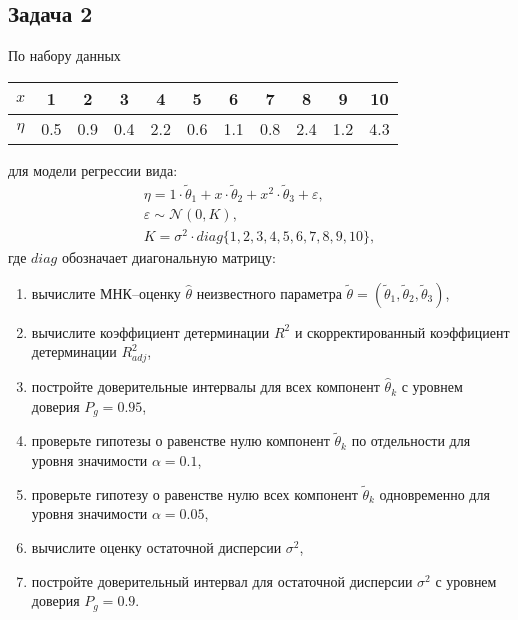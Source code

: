 \documentclass[a4paper,12pt]{article}
\begin{document}
\subsection*{Задача 2 \cite[391]{Efimov}}

По набору данных

\begin{center}
    \begin{tabular}{|c|c|c|c|c|c|c|c|c|c|c|}
        \hline
        $x$    & 1   & 2   & 3   & 4   & 5   & 6   & 7   & 8   & 9   & 10  \\
        \hline
        $\eta$ & 0.5 & 0.9 & 0.4 & 2.2 & 0.6 & 1.1 & 0.8 & 2.4 & 1.2 & 4.3 \\
        \hline
    \end{tabular}
\end{center}

\noindent для модели регрессии вида:
\begin{gather*}
    \eta = 1 \cdot \widetilde{\theta}_1 + x \cdot \widetilde{\theta}_2 + x^2 \cdot \widetilde{\theta}_3 + \varepsilon , \\
    \varepsilon \sim \mathcal{N} (0, K), \\
    K = \sigma^2 \cdot diag \{ 1, 2, 3, 4, 5, 6, 7, 8, 9, 10 \},
\end{gather*}
где $diag$ обозначает диагональную матрицу:
\begin{enumerate}
    \item вычислите МНК--оценку $\widehat{\theta}$ неизвестного параметра
          $\widetilde{\theta} = (\widetilde{\theta}_1, \widetilde{\theta}_2, \widetilde{\theta}_3)$,
    \item вычислите коэффициент детерминации $R^2$ и скорректированный коэффициент детерминации $R_{adj}^2$,
    \item постройте доверительные интервалы для всех компонент $\widehat{\theta}_k$ с уровнем доверия $P_g = 0.95$,
    \item проверьте гипотезы о равенстве нулю компонент $\widetilde{\theta}_k$ по отдельности для уровня значимости $\alpha = 0.1$,
    \item проверьте гипотезу о равенстве нулю всех компонент $\widetilde{\theta}_k$ одновременно для уровня значимости $\alpha = 0.05$,
    \item вычислите оценку остаточной дисперсии $\sigma^2$,
    \item постройте доверительный интервал для остаточной дисперсии $\sigma^2$ с уровнем доверия $P_g = 0.9$.
\end{enumerate}
\end{document}
